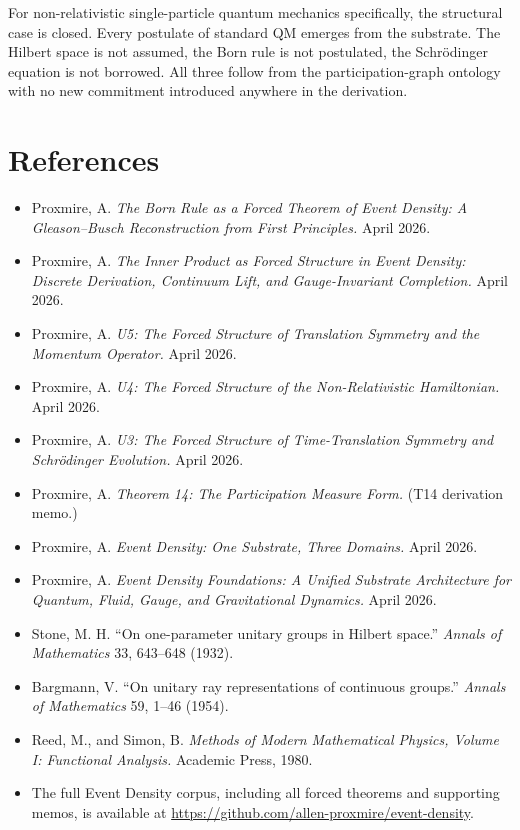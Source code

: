 \documentclass[11pt,a4paper]{article}
\begin{document}
For non-relativistic single-particle quantum mechanics specifically, the structural case is closed. Every postulate of standard QM emerges from the substrate. The Hilbert space is not assumed, the Born rule is not postulated, the Schr\"odinger equation is not borrowed. All three follow from the participation-graph ontology with no new commitment introduced anywhere in the derivation.

\section{References}

\begin{itemize}[noitemsep]
\item Proxmire, A. \textit{The Born Rule as a Forced Theorem of Event Density: A Gleason--Busch Reconstruction from First Principles.} April 2026.
\item Proxmire, A. \textit{The Inner Product as Forced Structure in Event Density: Discrete Derivation, Continuum Lift, and Gauge-Invariant Completion.} April 2026.
\item Proxmire, A. \textit{U5: The Forced Structure of Translation Symmetry and the Momentum Operator.} April 2026.
\item Proxmire, A. \textit{U4: The Forced Structure of the Non-Relativistic Hamiltonian.} April 2026.
\item Proxmire, A. \textit{U3: The Forced Structure of Time-Translation Symmetry and Schr\"odinger Evolution.} April 2026.
\item Proxmire, A. \textit{Theorem 14: The Participation Measure Form.} (T14 derivation memo.)
\item Proxmire, A. \textit{Event Density: One Substrate, Three Domains.} April 2026.
\item Proxmire, A. \textit{Event Density Foundations: A Unified Substrate Architecture for Quantum, Fluid, Gauge, and Gravitational Dynamics.} April 2026.
\item Stone, M. H. ``On one-parameter unitary groups in Hilbert space.'' \textit{Annals of Mathematics} 33, 643--648 (1932).
\item Bargmann, V. ``On unitary ray representations of continuous groups.'' \textit{Annals of Mathematics} 59, 1--46 (1954).
\item Reed, M., and Simon, B. \textit{Methods of Modern Mathematical Physics, Volume I: Functional Analysis.} Academic Press, 1980.
\item The full Event Density corpus, including all forced theorems and supporting memos, is available at \url{https://github.com/allen-proxmire/event-density}.
\end{itemize}
\end{document}
